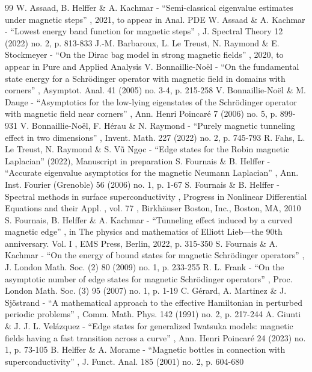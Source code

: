 \begin{thebibliography}{99}
 W. Assaad, B. Helffer \& A. Kachmar - “Semi-classical eigenvalue estimates under magnetic steps” , 2021, to appear in Anal. PDE
 W. Assaad \& A. Kachmar - “Lowest energy band function for magnetic steps” , J. Spectral Theory 12 (2022) no. 2, p. 813-833
 J.-M. Barbaroux, L. Le Treust, N. Raymond \& E. Stockmeyer - “On the Dirac bag model in strong magnetic fields” , 2020, to appear in Pure and Applied Analysis
 V. Bonnaillie-Noël - “On the fundamental state energy for a Schrödinger operator with magnetic field in domains with corners” , Asymptot. Anal. 41 (2005) no. 3-4, p. 215-258
 V. Bonnaillie-Noël \& M. Dauge - “Asymptotics for the low-lying eigenstates of the Schrödinger operator with magnetic field near corners” , Ann. Henri Poincaré 7 (2006) no. 5, p. 899-931
 V. Bonnaillie-Noël, F. Hérau \& N. Raymond - “Purely magnetic tunneling effect in two dimensions” , Invent. Math. 227 (2022) no. 2, p. 745-793
 R. Fahs, L. Le Treust, N. Raymond \& S. Vũ Ngọc - “Edge states for the Robin magnetic Laplacian” (2022), Manuscript in preparation
 S. Fournais \& B. Helffer - “Accurate eigenvalue asymptotics for the magnetic Neumann Laplacian” , Ann. Inst. Fourier (Grenoble) 56 (2006) no. 1, p. 1-67
 S. Fournais \& B. Helffer - Spectral methods in surface superconductivity , Progress in Nonlinear Differential Equations and their Appl. , vol. 77 , Birkhäuser Boston, Inc., Boston, MA, 2010
 S. Fournais, B. Helffer \& A. Kachmar - “Tunneling effect induced by a curved magnetic edge” , in The physics and mathematics of Elliott Lieb—the 90th anniversary. Vol. I , EMS Press, Berlin, 2022, p. 315-350
 S. Fournais \& A. Kachmar - “On the energy of bound states for magnetic Schrödinger operators” , J. London Math. Soc. (2) 80 (2009) no. 1, p. 233-255
 R. L. Frank - “On the asymptotic number of edge states for magnetic Schrödinger operators” , Proc. London Math. Soc. (3) 95 (2007) no. 1, p. 1-19
 C. Gérard, A. Martinez \& J. Sjöstrand - “A mathematical approach to the effective Hamiltonian in perturbed periodic problems” , Comm. Math. Phys. 142 (1991) no. 2, p. 217-244
 A. Giunti \& J. J. L. Velázquez - “Edge states for generalized Iwatsuka models: magnetic fields having a fast transition across a curve” , Ann. Henri Poincaré 24 (2023) no. 1, p. 73-105
 B. Helffer \& A. Morame - “Magnetic bottles in connection with superconductivity” , J. Funct. Anal. 185 (2001) no. 2, p. 604-680

\end{thebibliography}
